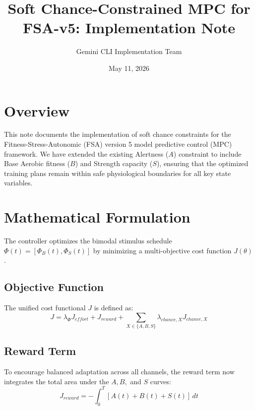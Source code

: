 \documentclass[11pt,a4paper]{article}
\title{Soft Chance-Constrained MPC for FSA-v5: Implementation Note}
\author{Gemini CLI Implementation Team}
\date{May 11, 2026}
\begin{document}
\maketitle

\section{Overview}
This note documents the implementation of soft chance constraints for the Fitness-Stress-Autonomic (FSA) version 5 model predictive control (MPC) framework. We have extended the existing Alertness ($A$) constraint to include Base Aerobic fitness ($B$) and Strength capacity ($S$), ensuring that the optimized training plans remain within safe physiological boundaries for all key state variables.

\section{Mathematical Formulation}

The controller optimizes the bimodal stimulus schedule $\Phi(t) = [\Phi_B(t), \Phi_S(t)]$ by minimizing a multi-objective cost function $J(\theta)$.

\subsection{Objective Function}
The unified cost functional $J$ is defined as:
\begin{equation}
J = \lambda_\Phi J_{effort} + J_{reward} + \sum_{X \in \{A, B, S\}} \lambda_{chance, X} J_{chance, X}
\end{equation}

\subsection{Reward Term}
To encourage balanced adaptation across all channels, the reward term now integrates the total area under the $A, B,$ and $S$ curves:
\begin{equation}
J_{reward} = - \int_0^T [A(t) + B(t) + S(t)] \, dt
\end{equation}
\end{document}
